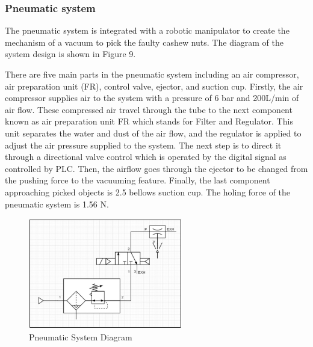 \documentclass[10pt, letterpaper]{article}
\begin{document}
\subsubsection*{Pneumatic system}
    The pneumatic system is integrated with a robotic manipulator to create the mechanism of a vacuum to pick the faulty cashew nuts. The diagram of the system design is shown in Figure 9.\par
    There are five main parts in the pneumatic system including an air compressor, air preparation unit (FR), control valve, ejector, and suction cup. Firstly, the air compressor supplies air to the system with a pressure of 6 bar and 200L/min of air flow. These compressed air travel through the tube to the next component known as air preparation unit FR which stands for Filter and Regulator. This unit separates the water and dust of the air flow, and the regulator is applied to adjust the air pressure supplied to the system. The next step is to direct it through a directional valve control which is operated by the digital signal as controlled by PLC. Then, the airflow goes through the ejector to be changed from the pushing force to the vacuuming feature. Finally, the last component approaching picked objects is 2.5 bellows suction cup. The holing force of the pneumatic system is 1.56 N.\par
    \begin{figure}[h]
        \centering
        \includegraphics[width=0.6\textwidth]{fig9.JPG}
        \caption{Pneumatic System Diagram}
    \end{figure}
\end{document}
